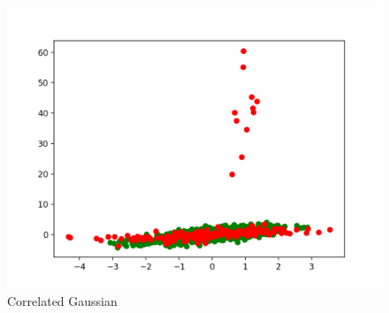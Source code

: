 \documentclass{article}
\begin{document}
\begin{figure}
    \centering
    \includegraphics[scale=0.6]{correlated_gaussian.png}
    \caption{Correlated Gaussian}
    \label{fig:my_label}
\end{figure}
\end{document}
